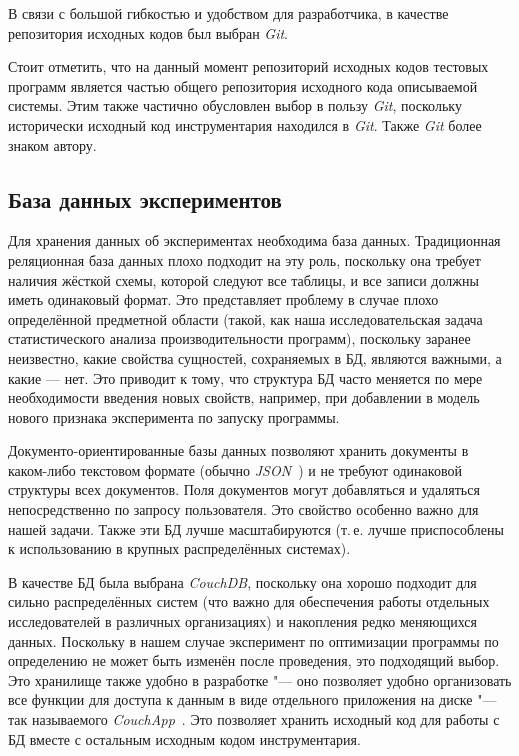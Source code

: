 В связи с большой гибкостью и удобством для разработчика, в качестве репозитория исходных кодов был выбран \textit{Git}.

Стоит отметить, что на данный момент репозиторий исходных кодов тестовых программ является частью общего репозитория исходного кода описываемой системы. Этим также частично обусловлен выбор в пользу \textit{Git}, поскольку исторически исходный код инструментария находился в \textit{Git}. Также \textit{Git} более знаком автору.


\subsection{База данных экспериментов}
Для хранения данных об экспериментах необходима база данных. Традиционная реляционная база данных плохо подходит на эту роль, поскольку она требует наличия жёсткой схемы, которой следуют все таблицы, и все записи должны иметь одинаковый формат. Это представляет проблему в случае плохо определённой предметной области (такой, как наша исследовательская задача статистического анализа производительности программ), поскольку заранее неизвестно, какие свойства сущностей, сохраняемых в БД, являются важными, а какие --- нет. Это приводит к тому, что структура БД часто меняется по мере необходимости введения новых свойств, например, при добавлении в модель нового признака эксперимента по запуску программы.

Документо-ориентированные базы данных позволяют хранить документы в каком-либо текстовом формате (обычно \textit{JSON}~\cite{json}) и не требуют одинаковой структуры всех документов. Поля документов могут добавляться и удаляться непосредственно по запросу пользователя. Это свойство особенно важно для нашей задачи. Также эти БД лучше масштабируются (т.\,е. лучше приспособлены к использованию в крупных распределённых системах).

В качестве БД была выбрана \textit{CouchDB}, поскольку она хорошо подходит для сильно распределённых систем (что важно для обеспечения работы отдельных исследователей в различных организациях) и накопления редко меняющихся данных. Поскольку в нашем случае эксперимент по оптимизации программы по определению не может быть изменён после проведения, это подходящий выбор.
Это хранилище также удобно в разработке "--- оно позволяет удобно организовать все функции для доступа к данным в виде отдельного приложения на диске "--- так называемого \textit{CouchApp}~\cite{couchapp}. Это позволяет хранить исходный код для работы с БД вместе с остальным исходным кодом инструментария.


